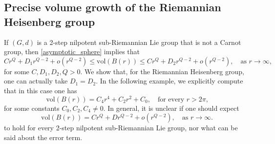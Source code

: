 \documentclass[a4paper,11pt,reqno]{amsart}
\theoremstyle{plain}
\theoremstyle{definition}
\newcommand{\vol}{\mathrm{vol}}
\begin{document}
\subsection{Precise volume growth of the Riemannian Heisenberg group}
If $(G,d)$ is a 2-step nilpotent sub-Riemannian Lie group that is not a Carnot group, then \cref{asymptotic_sphere} implies that
\begin{equation} \label{double}
 Cr^Q + D_1r^{Q-2} + o(r^{Q-2}) \le \vol(B(r)) \le Cr^Q + D_2r^{Q-2} + o(r^{Q-2}), \quad \text{as $r \to \infty$,}
\end{equation}
for some $C,D_1,D_2,Q > 0$. We show that, for the Riemannian Heisenberg group, one can actually take $D_1=D_2$. In the following example, we explicitly compute that in this case one has 
 \begin{equation} \label{volume_heis}
 \vol(B(r))=C_4 r^4 + C_2 r^2 + C_0, \quad \text{for every $r > 2 \pi$,}
 \end{equation}
 for some constants $C_0,C_2,C_4 \neq 0$. In general, it is unclear if one should expect 
 $$\vol(B(r)) = Cr^Q + Dr^{Q-2} + o(r^{Q-2}), \quad \text{as $r \to \infty$.}$$
 to hold for every 2-step nilpotent sub-Riemannian Lie group, nor what can be said about the error term.
\end{document}
